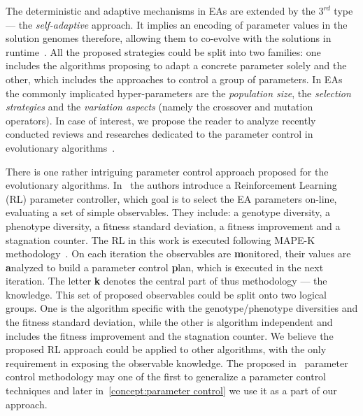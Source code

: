 The deterministic and adaptive mechanisms in EAs are extended by the $3^{rd}$ type — the \emph{self-adaptive} approach. It implies an encoding of parameter values in the solution genomes therefore, allowing them to co-evolve with the solutions in runtime~\cite{doerr2020theory}. All the proposed strategies could be split into two families: one includes the algorithms proposing to adapt a concrete parameter solely and the other, which includes the approaches to control a group of parameters. In EAs the commonly implicated hyper-parameters are the \emph{population size}, the \emph{selection strategies} and the \emph{variation aspects} (namely the crossover and mutation operators). In case of interest, we propose the reader to analyze recently conducted reviews and researches dedicated to the parameter control in evolutionary algorithms~\cite{karafotias2014parameter,aleti2016systematic,smith2020self,doerr2020theory}.

There is one rather intriguing parameter control approach proposed for the evolutionary algorithms. In~\cite{karafotias2014generic} the authors introduce a Reinforcement Learning (RL) parameter controller, which goal is to select the EA parameters on-line, evaluating a set of simple observables. They include: a genotype diversity, a phenotype diversity, a fitness standard deviation, a fitness improvement and a stagnation counter.
The RL in this work is executed following MAPE-K methodology~\cite{brun2009engineering}. On each iteration the observables are \textbf{m}onitored, their values are \textbf{a}nalyzed to build a parameter control \textbf{p}lan, which is \textbf{e}xecuted in the next iteration. The letter \textbf{k} denotes the central part of thus methodology — the knowledge.
This set of proposed observables could be split onto two logical groups. One is the algorithm specific with the genotype/phenotype diversities and the fitness standard deviation, while the other is algorithm independent and includes the fitness improvement and the stagnation counter. We believe the proposed RL approach could be applied to other algorithms, with the only requirement in exposing the observable knowledge. The proposed in~\cite{karafotias2014generic} parameter control methodology may one of the first to generalize a parameter control techniques and later in~\cref{concept:parameter control} we use it as a part of our approach.


